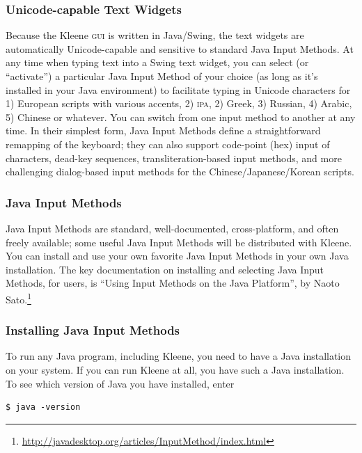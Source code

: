 \documentclass[letterpaper,12pt]{article}
\newcommand{\acro}{\textsc}
\begin{document}
\subsubsection{Unicode-capable Text Widgets}

Because the Kleene \acro{gui} is written in Java/Swing, the text widgets
are automatically Unicode-capable and sensitive to standard Java Input
Methods.  At any time when typing text into a Swing text widget, you can
select (or ``activate'') a particular Java Input Method of your choice
(as long as it's installed in your Java environment) to facilitate typing
in Unicode characters for 1) European scripts with various accents, 2)
\acro{ipa}, 2) Greek, 3) Russian, 4) Arabic, 5) Chinese or whatever.  You
can switch from one input method to another at any time.  In their
simplest form, Java Input Methods define a straightforward remapping of
the keyboard; they can also support code-point (hex) input of characters,
dead-key sequences, transliteration-based input methods, and more
challenging dialog-based input methods for the Chinese/Japanese/Korean
scripts.

\subsubsection{Java Input Methods}

Java Input Methods are standard, well-documented, cross-platform, and
often freely available; some useful Java Input Methods will be
distributed with Kleene.  You can install and use your own favorite Java
Input Methods in your own Java installation.  The key documentation on
installing and selecting Java Input Methods, for users, is ``Using Input
Methods on the Java Platform'', by Naoto
Sato.\footnote{\url{http://javadesktop.org/articles/InputMethod/index.html}}



\subsubsection{Installing Java Input Methods}

To run any Java program, including Kleene, you need to have a Java
installation on your system.  If you can run Kleene at all, you have such
a Java installation.  To see which version of Java you have installed,
enter

\begin{Verbatim}[fontsize=\small]
$ java -version
\end{Verbatim}
\end{document}
